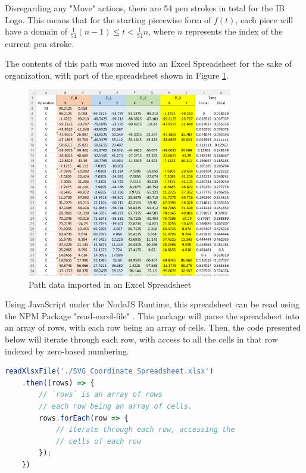 \documentclass[letterpaper, 12pt]{article}
\begin{document}
Disregarding any "Move" actions, there are 54 pen strokes
in total for the IB Logo. This means that for the starting piecewise
form of \(f(t)\), each piece will have a domain of \(\frac{1}{54}(n-1) \le t < \frac{1}{54}n\),
where \(n\) represents the index of the current pen stroke.

The contents of this path was moved into an Excel Spreadsheet for
the sake of organization, with part of the spreadsheet shown
in Figure \ref*{fig:svgxlsx}.

\begin{figure}[H]
    \centering
    \includegraphics[width=0.8\textwidth]{svgxlsx.png}
    \caption{Path data imported in an Excel Spreadsheet}
    \label{fig:svgxlsx}
\end{figure}

Using JavaScript under the NodeJS Runtime, this spreadsheet can
be read using the NPM Package "read-excel-file" \cite{kuchumovReadexcelfile}.
This package will parse the spreadsheet into an array of rows,
with each row being an array of cells. Then, the code presented
below will iterate through each row, with access to all the cells
in that row indexed by zero-based numbering.

\begin{lstlisting}[language=JavaScript]
    readXlsxFile('./SVG_Coordinate_Spreadsheet.xlsx')
    .then((rows) => {
        // `rows` is an array of rows
        // each row being an array of cells.
        rows.forEach(row => {
            // iterate through each row, accessing the
            // cells of each row
        });
    })
\end{lstlisting}
\end{document}
